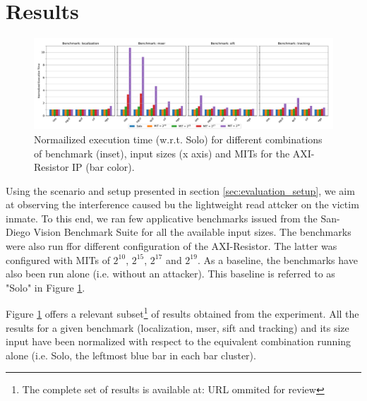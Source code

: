 \section{Results}
    \label{sec:results}
    \begin{figure}
        \centering
        \includegraphics[scale=0.425]{images/cpu-brainfreeze-interference.pdf}
        \caption{Normailized execution time (w.r.t. Solo) for different combinations of benchmark (inset), input sizes (x axis) and MITs for the AXI-Resistor IP (bar color).}
        \label{fig:cpu-brainfreeze-interference-results}
    \end{figure}


    Using the scenario and setup presented in section \ref{sec:evaluation_setup}, we aim at observing the interference caused bu the lightweight read attcker on the victim inmate. To this end, we ran few applicative benchmarks issued from the San-Diego Vision Benchmark Suite \cite{SD-VBS} for all the available input sizes. The benchmarks were also run ffor different configuration of the AXI-Resistor. The latter was configured with MITs of $2^{10}$, $2^{15}$, $2^{17}$ and $2^{19}$. As a baseline, the benchmarks have also been run alone (i.e. without an attacker). This baseline is referred to as "Solo" in Figure \ref{fig:cpu-brainfreeze-interference-results}.

    Figure \ref{fig:cpu-brainfreeze-interference-results} offers a relevant subset\footnote{The complete set of results is available at: URL ommited for review} of results obtained from the experiment. All the results for a given benchmark (localization, mser, sift and tracking) and its size input have been normalized with respect to the equivalent combination running alone (i.e. Solo, the leftmost blue bar in each bar cluster).

